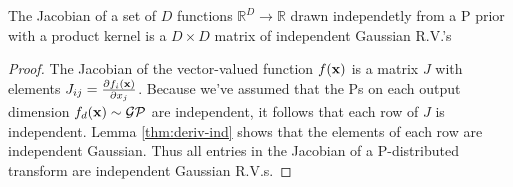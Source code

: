 \documentclass[twoside]{article}
\makeatletter
\newcommand{\Jx}{J_{\vx \rightarrow \vy}}
\newcommand{\Jxx}{J_{\vx \rightarrow \vy}(\vx)}
\newcommand{\Jy}{J_{\vy \rightarrow \vx}}
\newlength{\nonHumbleHeight}
\def\@humbleformat#1{{\settoheight{\nonHumbleHeight}{#1}\resizebox{!}{0.94\nonHumbleHeight}{#1}}}%
\def\humble#1{\@humbleformat{#1}}%
\newcommand{\gp}{{\humble GP}}
\makeatother
\begin{document}
\begin{lemma}
\label{thm:matrix}
The Jacobian of a set of $D$ functions $\mathbb{R}^D \rightarrow \mathbb{R}$ drawn independetly from a \gp{} prior with a product kernel is a $D \times D$ matrix of independent Gaussian R.V.'s
\end{lemma}
%
\begin{proof}
The Jacobian of the vector-valued function $f({\bf{x}})$ is a matrix $J$ with elements ${J_{ij} = \frac{ \partial f_i ({\bf{x}}) }{\partial x_j}}$.
%
%
%
Because we've assumed that the \gp{}s on each output dimension $f_d({\bf{x}}) \sim \mathcal{GP}$ are independent, it follows that each row of $J$ is independent.
Lemma \ref{thm:deriv-ind} shows that the elements of each row are independent Gaussian.
Thus all entries in the Jacobian of a \gp{}-distributed transform are independent Gaussian R.V.s.
\end{proof}

\end{document}
